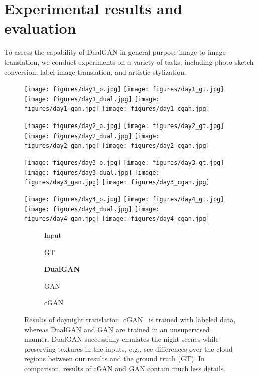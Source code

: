 \section{Experimental results and evaluation}
\label{sect:exp}

To assess the capability of DualGAN in general-purpose image-to-image translation, we 
conduct experiments on a variety of tasks, including photo-sketch conversion, 
label-image translation, and artistic stylization.

\begin{figure}
\begin{center}
\texttt{[image: figures/day1\_o.jpg]}
\texttt{[image: figures/day1\_gt.jpg]}
\texttt{[image: figures/day1\_dual.jpg]}
\texttt{[image: figures/day1\_gan.jpg]}
\texttt{[image: figures/day1\_cgan.jpg]}

\texttt{[image: figures/day2\_o.jpg]}
\texttt{[image: figures/day2\_gt.jpg]}
\texttt{[image: figures/day2\_dual.jpg]}
\texttt{[image: figures/day2\_gan.jpg]}
\texttt{[image: figures/day2\_cgan.jpg]}

\texttt{[image: figures/day3\_o.jpg]}
\texttt{[image: figures/day3\_gt.jpg]}
\texttt{[image: figures/day3\_dual.jpg]}
\texttt{[image: figures/day3\_gan.jpg]}
\texttt{[image: figures/day3\_cgan.jpg]}

\texttt{[image: figures/day4\_o.jpg]}
\texttt{[image: figures/day4\_gt.jpg]}
\texttt{[image: figures/day4\_dual.jpg]}
\texttt{[image: figures/day4\_gan.jpg]}
\texttt{[image: figures/day4\_cgan.jpg]}

\begin{subfigure}[]{0.19\linewidth}\caption*{Input}\end{subfigure}
\begin{subfigure}[]{0.19\linewidth}\caption*{GT}\end{subfigure}
\begin{subfigure}[]{0.19\linewidth}\caption*{\textbf{DualGAN}}\end{subfigure}
\begin{subfigure}[]{0.19\linewidth}\caption*{GAN}\end{subfigure}
\begin{subfigure}[]{0.19\linewidth}\caption*{cGAN~\cite{isola2016image}}\end{subfigure}
\caption{Results of daynight translation. cGAN~\cite{isola2016image} is trained with labeled data, whereas DualGAN and GAN are trained in an unsupervised manner. DualGAN successfully emulates the night scenes while preserving textures in the inputs, e.g., see differences over the cloud regions between our results and the ground truth (GT). In comparison, results of cGAN and GAN contain much less details.}
\label{fig:day}
\end{center}
\end{figure}




